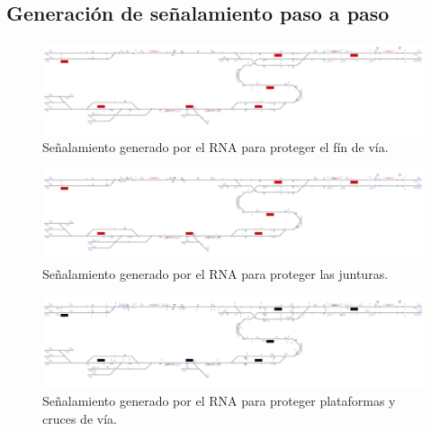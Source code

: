 \subsection{Generación de señalamiento paso a paso}

\lipsum[1]

\begin{figure}[H]
	\centering
	\includegraphics[width=1\textwidth]{resultados-obtenidos/ejemplo3/images/3_step1.png}
	\centering\caption{Señalamiento generado por el RNA para proteger el fín de vía.}
\end{figure}

\lipsum[1]

\begin{figure}[H]
	\centering
	\includegraphics[width=1\textwidth]{resultados-obtenidos/ejemplo3/images/3_step2.png}
	\centering\caption{Señalamiento generado por el RNA para proteger las junturas.}
\end{figure}

\lipsum[1]

\begin{figure}[H]
	\centering
	\includegraphics[width=1\textwidth]{resultados-obtenidos/ejemplo3/images/3_step3.png}
	\centering\caption{Señalamiento generado por el RNA para proteger plataformas y cruces de vía.}
\end{figure}

\lipsum[1]

